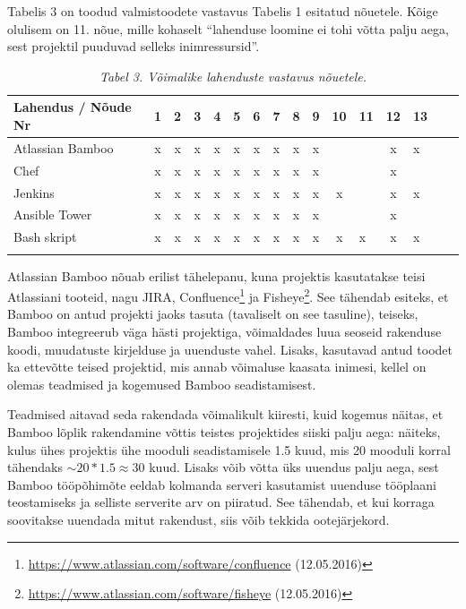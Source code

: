 \documentclass[12pt]{article}
\begin{document}
  Tabelis 3 on toodud valmistoodete vastavus Tabelis 1 esitatud nõuetele. Kõige olulisem on 11. nõue, mille kohaselt ``lahenduse loomine ei tohi võtta palju aega, sest projektil puuduvad selleks inimressursid''.
  
  \begin{table}[H]
    \caption*{\textit{Tabel 3. Võimalike lahenduste vastavus nõuetele.}}
    
    \begin{tabular}{ |l|c|c|c|c|c|c|c|c|c|c V{4} c V{4} c|c| }
      \hline
      \textbf{Lahendus / Nõude Nr} & \textbf{1} & \textbf{2} & \textbf{3} & \textbf{4} & \textbf{5} & \textbf{6} & \textbf{7} & \textbf{8} & \textbf{9} & \textbf{10} & \textbf{11} & \textbf{12} & \textbf{13}\\
      \hline
      Atlassian Bamboo & x & x & x & x & x & x & x & x & x & & & x & x\\
      \hline
      Chef & x & x & x & x & x & x & x & x & x & & & x &\\
      \hline
      Jenkins & x & x & x & x & x & x & x & x & x & x & & x & x\\
      \hline
      Ansible Tower & x & x & x & x & x & x & x & x & x & & & x & \\
      \hline
      Bash skript & x & x & x & x & x & x & x & x & x & x & x & x & x\\
      \hline
    \end{tabular}
  \end{table}

  Atlassian Bamboo nõuab erilist tähelepanu, kuna projektis kasutatakse teisi Atlassiani tooteid, nagu JIRA, Confluence\footnote{\url{https://www.atlassian.com/software/confluence} (12.05.2016)} ja Fisheye\footnote{\url{https://www.atlassian.com/software/fisheye} (12.05.2016)}. See tähendab esiteks, et Bamboo on antud projekti jaoks tasuta (tavaliselt on see tasuline), teiseks, Bamboo integreerub väga hästi projektiga, võimaldades luua seoseid rakenduse koodi, muudatuste kirjelduse ja uuenduste vahel. Lisaks, kasutavad antud toodet ka ettevõtte teised projektid, mis annab võimaluse kaasata inimesi, kellel on olemas teadmised ja kogemused Bamboo seadistamisest.
  
  Teadmised aitavad seda rakendada võimalikult kiiresti, kuid kogemus näitas, et Bamboo lõplik rakendamine võttis teistes projektides siiski palju aega: näiteks, kulus ühes projektis ühe mooduli seadistamisele 1.5 kuud, mis 20 mooduli korral tähendaks $\sim20*1.5 \approx 30$ kuud. Lisaks võib võtta üks uuendus palju aega, sest Bamboo tööpõhimõte eeldab kolmanda serveri kasutamist uuenduse tööplaani teostamiseks ja selliste serverite arv on piiratud. See tähendab, et kui korraga soovitakse uuendada mitut rakendust, siis võib tekkida ootejärjekord.
  
\end{document}
